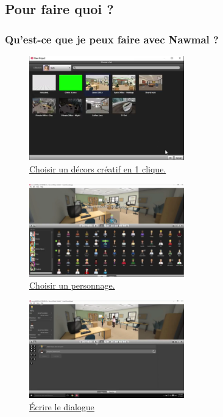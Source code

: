 \subsection{Pour faire quoi ?} 
		\begin{frame}[allowframebreaks]
			\frametitle{Qu'est-ce que je peux faire avec Nawmal ?}
			\begin{figure}
                     \centering
                     \includegraphics[width = 0.6\textwidth]{nawmaldecor2.png}
                     \caption{\tiny{\href{run:nawmaldecor.2png}{Choisir un décors créatif en 1 clique.}}}
                   \end{figure}
                   
                   \begin{figure}
                     \centering
                     \includegraphics[width = 0.6\textwidth]{nawmalpersonnage2.png}
                     \caption{\tiny{\href{run:nawmalpersonnage2.png}{Choisir un personnage.}}}
                   \end{figure}
                   
                   \begin{figure}
                     \centering
                     \includegraphics[width = 0.6\textwidth]{nawmaldialogue2.png}
                     \caption{\tiny{\href{run:nawmaldialogue2.png}{Écrire le dialogue}}}
                   \end{figure}
                   
                   								
			\end{frame}	
			
